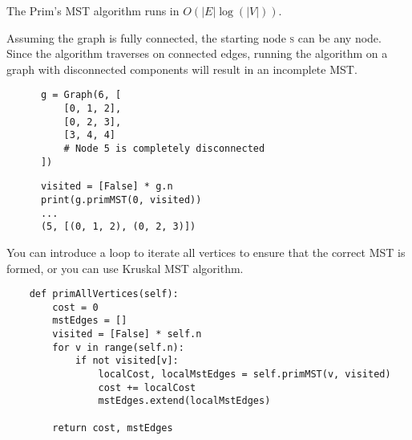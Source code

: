 \noindent The Prim's MST algorithm runs in $O(|E| \log (|V|))$.

\noindent Assuming the graph is fully connected, the starting node \textsc{s} can be any node.
Since the algorithm traverses on connected edges, running the algorithm on a graph with disconnected components will result in an incomplete MST.

\begin{center}
  \begin{verbatim}
      g = Graph(6, [
          [0, 1, 2],
          [0, 2, 3],
          [3, 4, 4]
          # Node 5 is completely disconnected
      ])
  \end{verbatim}


  \begin{verbatim}
      visited = [False] * g.n
      print(g.primMST(0, visited))
      ...
      (5, [(0, 1, 2), (0, 2, 3)])
  \end{verbatim}
\end{center}

\noindent You can introduce a loop to iterate all vertices to ensure that the correct MST is formed, or you can use Kruskal MST algorithm.

\begin{verbatim}
    def primAllVertices(self):
        cost = 0
        mstEdges = []
        visited = [False] * self.n
        for v in range(self.n):
            if not visited[v]:
                localCost, localMstEdges = self.primMST(v, visited)
                cost += localCost
                mstEdges.extend(localMstEdges)

        return cost, mstEdges
\end{verbatim}

